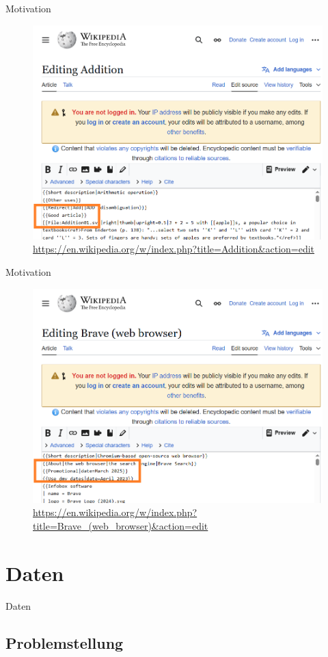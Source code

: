 \documentclass[aspectratio=169]{beamer} %
\begin{document}
\begin{frame}{Motivation}
    \begin{figure}
        \centering
        \includegraphics[width=0.6\linewidth]{figures/wp-screenshot-good-source.png}
        \caption{\url{https://en.wikipedia.org/w/index.php?title=Addition&action=edit}}
    \end{figure}
\end{frame}

\begin{frame}{Motivation}
    \begin{figure}
        \centering
        \includegraphics[width=0.6\linewidth]{figures/wp-screenshot-promo-source.png}
        \caption{\url{https://en.wikipedia.org/w/index.php?title=Brave_(web_browser)&action=edit}}
    \end{figure}
\end{frame}

\section{Daten}

\begin{frame}{Daten}
\end{frame}

\subsection{Problemstellung}
\end{document}
